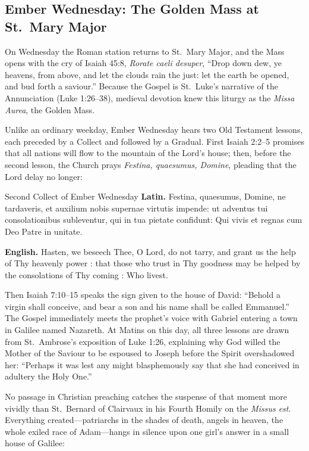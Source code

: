 \subsection{Ember Wednesday: The Golden Mass at St.~Mary Major}

On Wednesday the Roman station returns to St.~Mary Major, and the Mass opens
with the cry of Isaiah 45:8, \textit{Rorate caeli desuper}, ``Drop down dew, ye
heavens, from above, and let the clouds rain the just: let the earth be opened,
and bud forth a saviour.'' Because the Gospel is St.~Luke's narrative of the
Annunciation (Luke 1:26--38), medieval devotion knew this liturgy as the
\textit{Missa Aurea}, the Golden Mass.

Unlike an ordinary weekday, Ember Wednesday hears two Old Testament lessons,
each preceded by a Collect and followed by a Gradual. First Isaiah 2:2--5
promises that all nations will flow to the mountain of the Lord's house; then,
before the second lesson, the Church prays \textit{Festina, quaesumus, Domine},
pleading that the Lord delay no longer:

\begin{massbox}{Second Collect of Ember Wednesday}
\textbf{Latin.} Festina, quaesumus, Domine, ne tardaveris, et auxilium nobis
supernae virtutis impende: ut adventus tui consolationibus subleventur, qui in
tua pietate confidunt: Qui vivis et regnas cum Deo Patre in unitate.

\textbf{English.} Hasten, we beseech Thee, O Lord, do not tarry, and grant us
the help of Thy heavenly power : that those who trust in Thy goodness may be
helped by the consolations of Thy coming : Who livest.
\end{massbox}

Then Isaiah 7:10--15 speaks the sign given to the house of David: ``Behold a
virgin shall conceive, and bear a son and his name shall be called Emmanuel.''
The Gospel immediately meets the prophet's voice with Gabriel entering a town
in Galilee named Nazareth. At Matins on this day, all three lessons are drawn
from St.~Ambrose's exposition of Luke 1:26, explaining why God willed the
Mother of the Saviour to be espoused to Joseph before the Spirit overshadowed
her: ``Perhaps it was lest any might blasphemously say that she had conceived
in adultery the Holy One.''

No passage in Christian preaching catches the suspense of that moment more
vividly than St.~Bernard of Clairvaux in his Fourth Homily on the
\textit{Missus est}. Everything created---patriarchs in the shades of death,
angels in heaven, the whole exiled race of Adam---hangs in silence upon one
girl's answer in a small house of Galilee:

